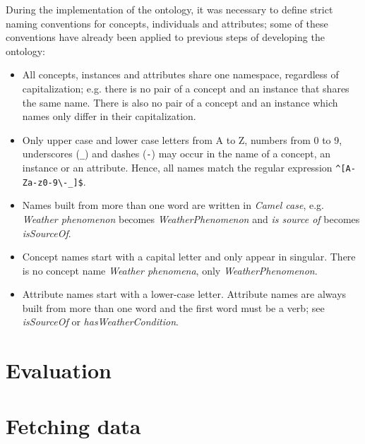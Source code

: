 During the implementation of the \thinkhomeweather ontology, it was necessary to define strict naming conventions for concepts, individuals and attributes; some of these conventions have already been applied to previous steps of developing the ontology:

\begin{itemize}
  \item All concepts, instances and attributes share one namespace, regardless of capitalization; e.g. there is no pair of a concept and an instance that shares the same name. There is also no pair of a concept and an instance which names only differ in their capitalization.
  \item Only upper case and lower case letters from A to Z, numbers from 0 to 9, underscores (\texttt{\_}) and dashes (\texttt{-}) may occur in the name of a concept, an instance or an attribute. Hence, all names match the regular expression \texttt{\^{}[A-Za-z0-9\textbackslash -\_]\$}.
  \item Names built from more than one word are written in \emph{Camel case}, e.g. \emph{Weather phenomenon} becomes \emph{WeatherPhenomenon} and \emph{is source of} becomes \emph{isSourceOf}. %
  \item Concept names start with a capital letter and only appear in singular. There is no concept name \emph{Weather phenomena}, only \emph{WeatherPhenomenon}.
  \item Attribute names start with a lower-case letter. Attribute names are always built from more than one word and the first word must be a verb; see \emph{isSourceOf} or \emph{hasWeatherCondition}.
\end{itemize}


\section{Evaluation}
\label{ch:ontology_evaluation}


\section{Fetching data}


